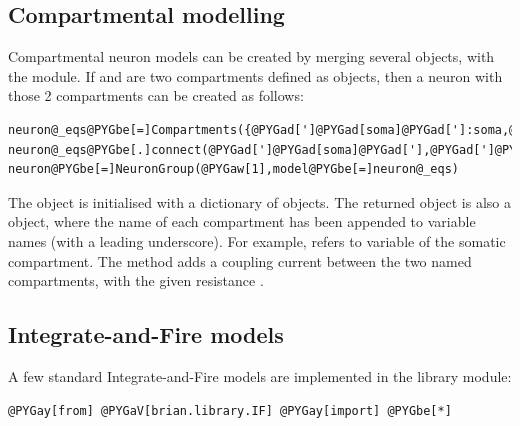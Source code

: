 \documentclass[letterpaper,10pt,english]{manual}
\begin{document}
\subsection{Compartmental modelling}

Compartmental neuron models can be created by merging several  objects,
with the  module. If  and  are two compartments defined as
 objects, then a neuron with those 2 compartments can be created as follows:

\begin{Verbatim}[commandchars=@\[\]]
neuron@_eqs@PYGbe[=]Compartments({@PYGad[']@PYGad[soma]@PYGad[']:soma,@PYGad[']@PYGad[dendrite]@PYGad[']:dendrite})
neuron@_eqs@PYGbe[.]connect(@PYGad[']@PYGad[soma]@PYGad['],@PYGad[']@PYGad[dendrite]@PYGad['],Ra)
neuron@PYGbe[=]NeuronGroup(@PYGaw[1],model@PYGbe[=]neuron@_eqs)
\end{Verbatim}

The  object is initialised with a dictionary of  objects.
The returned object  is also a  object, where the name of
each compartment has been appended to variable names (with a leading underscore).
For example,  refers to variable  of the somatic compartment.
The  method adds a coupling current between the two named compartments, with the given
resistance .


\subsection{Integrate-and-Fire models}

A few standard Integrate-and-Fire models are implemented in the  library module:

\begin{Verbatim}[commandchars=@\[\]]
@PYGay[from] @PYGaV[brian.library.IF] @PYGay[import] @PYGbe[*]
\end{Verbatim}
\end{document}
